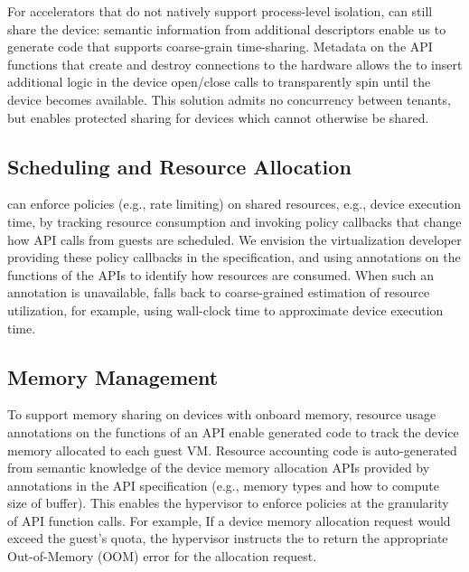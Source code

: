 For accelerators that do not natively support process-level isolation,
\AvA can still share the device: semantic information from additional \Lapis
descriptors enable us to generate code that supports coarse-grain
time-sharing. Metadata on the API functions that create and destroy
connections to the hardware allows the \CAvA to insert additional logic in the
device open/close calls to transparently spin until the device becomes
available. This solution admits no concurrency between tenants, but enables
protected sharing for devices which cannot otherwise be shared.

\subsection{Scheduling and Resource Allocation}
\label{s:rate_limit}
\label{s:api_throttling}

\AvA can enforce policies (e.g., rate limiting) on shared resources, e.g.,
device execution time, by tracking resource consumption and invoking policy
callbacks that change how API calls from guests are scheduled. We envision the
virtualization developer providing these policy callbacks in the \Lapis
specification, and using annotations on the functions of the APIs to identify
how resources are consumed. When such an annotation is unavailable, \AvA falls
back to coarse-grained estimation of resource utilization, for example, using
wall-clock time to approximate device execution time.

\subsection{Memory Management}
To support memory sharing on devices with onboard memory, \Lapis resource
usage annotations on the functions of an API enable generated code to track
the device memory allocated to each guest VM. Resource accounting code is
auto-generated from semantic knowledge of the device memory allocation APIs
provided by annotations in the API specification (e.g., memory types and how
to compute size of buffer). This enables the hypervisor to enforce policies at
the granularity of API function calls. For example, If a device memory
allocation request would exceed the guest's quota, the hypervisor instructs
the \worker to return the appropriate Out-of-Memory (OOM) error for the
allocation request.
